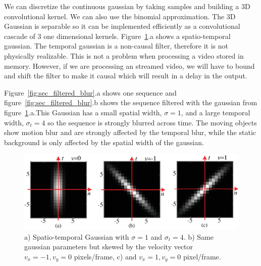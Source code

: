 We can discretize the continuous gaussian by taking samples and building a 3D convolutional kernel. We can also use the binomial approximation. The 3D Gaussian is separable so it can be implemented efficiently as a convolutional cascade of 3 one dimensional kernels. Figure~\ref{fig:seq_filtered_kernel}.a shows a spatio-temporal gaussian. The temporal gaussian is a non-causal filter, therefore it is not physically realizable. This is not a problem when processing a video stored in memory. However, if we are processing an streamed video, we will have to bound and shift the filter to make it causal which will result in a delay in the output.

Figure~\ref{fig:sec_filtered_blur}.a shows one sequence and figure~\ref{fig:sec_filtered_blur}.b shows the sequence filtered with the gaussian from figure~\ref{fig:seq_filtered_kernel}.a.This Gaussian has a small spatial width, $\sigma=1$, and a large temporal width, $\sigma_t=4$ so the sequence is strongly blurred across time. The moving objects show motion blur and are strongly affected by the temporal blur, while the static background is only affected by the spatial width of the gaussian.

\begin{figure}
    \includegraphics[width=1\linewidth]{figures/temporal_filters/seq_filtered_kernel.eps}
    \caption{a) Spatio-temporal Gaussian with $\sigma=1$ and $\sigma_t=4$.  b) Same gaussian parameters but skewed by the velocity vector $v_x=-1, v_y=0$ pixels/frame, c) and $v_x=1, v_y=0$ pixel/frame.}
    \label{fig:seq_filtered_kernel}
\end{figure}


